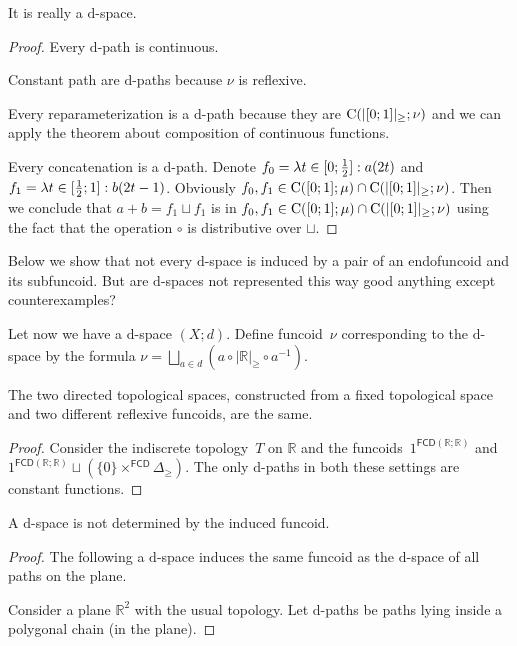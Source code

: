 \begin{prop}
It is really a $\mathrm{d}$-space.
\end{prop}

\begin{proof}
Every $\mathrm{d}$-path is continuous.

Constant path are $\mathrm{d}$-paths because $\nu$ is reflexive.

Every reparameterization is a $\mathrm{d}$-path because they are $\mathrm{C}(|[0;1]|_{\geq}; \nu)$ and we can apply the theorem about
composition of continuous functions.

Every concatenation is a $\mathrm{d}$-path. Denote
$f_0 = \lambda t\in[0;\frac{1}{2}]:a(2t)$ and $f_1 = \lambda t\in[\frac{1}{2};1]:b(2t-1)$.
Obviously $f_0,f_1 \in \mathrm{C}([0;1];\mu) \cap \mathrm{C}(|[0;1]|_{\geq}; \nu)$.
Then we conclude that $a+b = f_1\sqcup f_1$ is in $f_0,f_1 \in \mathrm{C}([0;1];\mu) \cap \mathrm{C}(|[0;1]|_{\geq}; \nu)$
using the fact that the operation $\circ$ is distributive over $\sqcup$.
\end{proof}

Below we show that not every $\mathrm{d}$-space is induced by a pair of an endofuncoid and its subfuncoid.
But are $\mathrm{d}$-spaces not represented this way good anything except counterexamples?

Let now we have a $\mathrm{d}$-space $(X;d)$. Define funcoid~$\nu$ corresponding to the $\mathrm{d}$-space by the formula
$\nu = \bigsqcup_{a\in d}(a\circ |\mathbb{R}|_{\geq}\circ a^{-1})$.

\begin{example}
The two directed topological spaces, constructed from a fixed topological space and two different reflexive funcoids,
are the same.
\end{example}

\begin{proof}
Consider the indiscrete topology~$T$ on $\mathbb{R}$ and the funcoids~$1^{\mathsf{FCD}(\mathbb{R};\mathbb{R})}$
and $1^{\mathsf{FCD}(\mathbb{R};\mathbb{R})}\sqcup(\{0\}\times^{\mathsf{FCD}} \Delta_{\geq})$.
The only $\mathrm{d}$-paths in both these settings are constant functions.
\end{proof}

\begin{example}
A $\mathrm{d}$-space is not determined by the induced funcoid.
\end{example}

\begin{proof}
The following a $\mathrm{d}$-space induces the same funcoid as the $\mathrm{d}$-space of all paths on the plane.

Consider a plane $\mathbb{R}^2$ with the usual topology. Let $\mathrm{d}$-paths be paths lying inside a polygonal chain (in the plane).
\end{proof}

